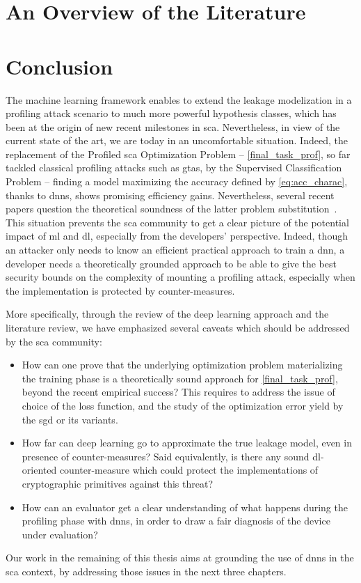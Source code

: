 \section{An Overview of the Literature}
    \label{sec:review_dl_sca}
    

\section{Conclusion}
    The machine learning framework enables to extend the leakage modelization in a profiling attack scenario to much more powerful hypothesis classes, which has been at the origin of new recent milestones in \gls{sca}.
    Nevertheless, in view of the current state of the art, we are today in an uncomfortable situation.
    Indeed, the replacement of the Profiled \gls{sca} Optimization Problem -- \ie{} \autoref{final_task_prof}, so far tackled classical profiling attacks such as \glspl{gta}, by the Supervised Classification Problem -- \ie{} finding a model maximizing the accuracy defined by \autoref{eq:acc_charac}, thanks to \glspl{dnn}, shows promising efficiency gains.
    Nevertheless, several recent papers question the theoretical soundness of the latter problem substitution~\cite{cagli_convolutional_2017,picek_curse_2019}.
    This situation prevents the \gls{sca} community to get a clear picture of the potential impact of \gls{ml} and \gls{dl}, especially from the developers' perspective.
    Indeed, though an attacker only needs to know an efficient practical approach to train a \gls{dnn}, a developer needs a theoretically grounded approach to be able to give the best security bounds on the complexity of mounting a profiling attack, especially when the implementation is protected by counter-measures.

    More specifically, through the review of the deep learning approach and the literature review, we have emphasized several caveats which should be addressed by the \gls{sca} community:
    \begin{itemize}
        \item How can one prove that the underlying optimization problem materializing the training phase is a theoretically sound approach for \autoref{final_task_prof}, beyond the recent empirical success?
        This requires to address the issue of choice of the loss function, and the study of the optimization error yield by the \gls{sgd} or its variants.
        \item How far can deep learning go to approximate the true leakage model, even in presence of counter-measures?
        Said equivalently, is there any sound \gls{dl}-oriented counter-measure which could protect the implementations of cryptographic primitives against this threat?
        \item How can an evaluator get a clear understanding of what happens during the profiling phase with \glspl{dnn}, in order to draw a fair diagnosis of the device under evaluation?
    \end{itemize}
    Our work in the remaining of this thesis aims at grounding the use of \glspl{dnn} in the \gls{sca} context, by addressing those issues in the next three chapters.